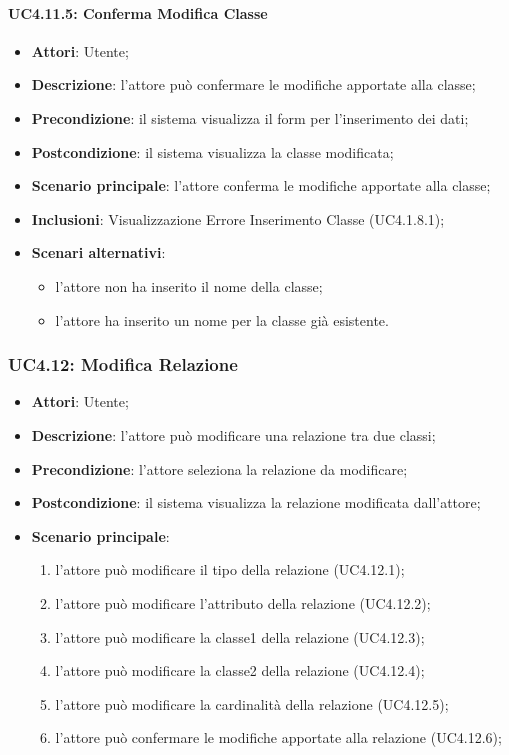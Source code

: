 \paragraph{UC4.11.5: Conferma Modifica Classe}
\label{UC4.11.5}
\begin{itemize}
	\item \textbf{Attori}: Utente;
	\item \textbf{Descrizione}: l'attore può confermare le modifiche apportate alla classe;
	\item \textbf{Precondizione}: il sistema visualizza il form per l'inserimento dei dati;
	\item \textbf{Postcondizione}: il sistema visualizza la classe modificata;
	\item \textbf{Scenario principale}: l'attore conferma le modifiche apportate alla classe;
	\item \textbf{Inclusioni}:
	Visualizzazione Errore Inserimento Classe (UC4.1.8.1);
	\item \textbf{Scenari alternativi}:
	\begin{itemize}
		\item l'attore non ha inserito il nome della classe;
		\item l'attore ha inserito un nome per la classe già esistente.
	\end{itemize}
\end{itemize}

\subsubsection{UC4.12: Modifica Relazione}
\label{UC4.12}
\begin{itemize}
	\item \textbf{Attori}: Utente;
	\item \textbf{Descrizione}: l'attore può modificare una relazione tra due classi;
	\item \textbf{Precondizione}: l'attore seleziona la relazione da modificare;
	\item \textbf{Postcondizione}: il sistema visualizza la relazione modificata dall'attore;
	\item \textbf{Scenario principale}:
	\begin{enumerate}
		\item l'attore può modificare il tipo della relazione (UC4.12.1);
		\item l'attore può modificare l'attributo della relazione (UC4.12.2);
		\item l'attore può modificare la classe1 della relazione (UC4.12.3);
		\item l'attore può modificare la classe2 della relazione (UC4.12.4);
		\item l'attore può modificare la cardinalità della relazione (UC4.12.5);
		\item l'attore può confermare le modifiche apportate alla relazione (UC4.12.6);
	\end{enumerate}
\end{itemize}

